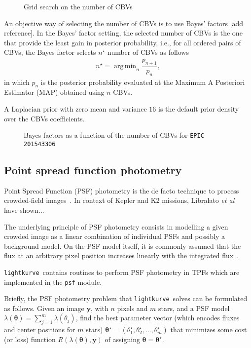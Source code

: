 \documentclass[twocolumn]{aastex62}
\newcommand{\lightkurve}{\texttt{lightkurve}}
\DeclareMathOperator*{\argmin}{arg\,min}
\begin{document}
\begin{figure}[!htb]
    \centering
    \caption{Grid search on the number of CBVs}
    \label{fig:cbv-grid-search}
\end{figure}

An objective way of selecting the number of CBVs is to use Bayes' factors
[add reference]. In the Bayes' factor setting, the selected number of
CBVs is the one that provide the least gain in posterior probability, i.e.,
for all ordered pairs of CBVs, the Bayes factor selects $n^{\star}$ number of CBVs
as follows
\begin{align}
    n^{\star} = \argmin_{n} \dfrac{p_{n+1}}{p_n},
\end{align}
in which $p_n$ is the posterior probability evaluated at the Maximum A Posteriori
Estimator (MAP) obtained using $n$ CBVs.

A Laplacian prior with zero mean and variance $16$ is the default prior
density over the CBVs coefficients.

\begin{figure}[!htb]
    \centering
    \caption{Bayes factors as a function of the number of CBVs for \texttt{EPIC 201543306}}
    \label{fig:cbv-grid-search}
\end{figure}


\subsection{Point spread function photometry}

Point Spread Function (PSF) photometry is the de facto technique to
process crowded-field images~\cite{stetson1987, heasley1999}. In context of Kepler
and K2 missions, Libralato \textit{et al}~\cite{libralato2016} have shown...

The underlying principle of PSF photometry consists in modelling a given crowded
image as a linear combination of individual PSFs and possibly a background model.
On the PSF model itself, it is commonly assumed that the flux
at an arbitrary pixel position increases linearly with the integrated
flux~\cite{stetson1987, heasley1999}.

\lightkurve ~contains routines to perform PSF photometry in TPFs
which are implemented in the \texttt{psf} module.

Briefly, the PSF photometry problem that \lightkurve~solves can be formulated as
follows. Given an image $\bm{y}$, with $n$ pixels and $m$ stars, and a PSF model
$\lambda(\bm{\theta}) = \sum_{j=1}^{m} \lambda({\theta}_j)$,
find the best parameter vector (which encodes fluxes and center positions for $m$
stars) $\bm{\theta}^{\star} = (\theta_1^{\star}, \theta_2^{\star}, ..., \theta_m^{\star})$
that minimizes some cost (or loss) function $R(\lambda(\bm{\theta}), \bm{y})$
of assigning $\bm{\theta} = \bm{\theta}^{\star}$.
\end{document}

